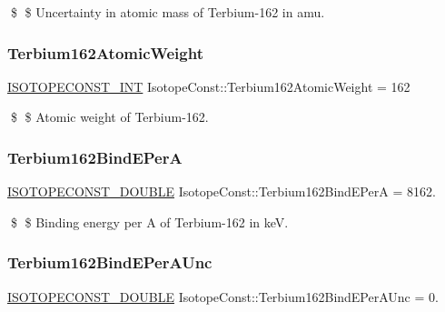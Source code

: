 \$ \$ Uncertainty in atomic mass of Terbium-\/162 in amu. \mbox{\label{group___isotope_const-_terbium-_tb162_ga966843c5ee19860da246c96a485b816e}} 
\subsubsection{\texorpdfstring{Terbium162\+Atomic\+Weight}{Terbium162AtomicWeight}}
{\footnotesize\ttfamily \mbox{\hyperlink{group___isotope_const-_macros_ga5f18360b3e99483a35c32d789e62621c}{I\+S\+O\+T\+O\+P\+E\+C\+O\+N\+S\+T\+\_\+\+I\+NT}} Isotope\+Const\+::\+Terbium162\+Atomic\+Weight = 162}

\$ \$ Atomic weight of Terbium-\/162. \mbox{\label{group___isotope_const-_terbium-_tb162_ga92ab952779c6d1ac498ed8551115b4c4}} 
\subsubsection{\texorpdfstring{Terbium162\+Bind\+E\+PerA}{Terbium162BindEPerA}}
{\footnotesize\ttfamily \mbox{\hyperlink{group___isotope_const-_macros_ga8f45a7272ce02c0b4c65c44636ed719a}{I\+S\+O\+T\+O\+P\+E\+C\+O\+N\+S\+T\+\_\+\+D\+O\+U\+B\+LE}} Isotope\+Const\+::\+Terbium162\+Bind\+E\+PerA = 8162.}

\$ \$ Binding energy per A of Terbium-\/162 in keV. \mbox{\label{group___isotope_const-_terbium-_tb162_ga998c7e278fd6aa9c3ecc4f615f64c316}} 
\subsubsection{\texorpdfstring{Terbium162\+Bind\+E\+Per\+A\+Unc}{Terbium162BindEPerAUnc}}
{\footnotesize\ttfamily \mbox{\hyperlink{group___isotope_const-_macros_ga8f45a7272ce02c0b4c65c44636ed719a}{I\+S\+O\+T\+O\+P\+E\+C\+O\+N\+S\+T\+\_\+\+D\+O\+U\+B\+LE}} Isotope\+Const\+::\+Terbium162\+Bind\+E\+Per\+A\+Unc = 0.}

